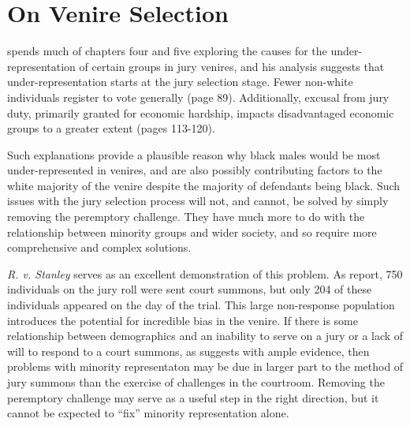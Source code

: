 \section{On Venire Selection}

\cite{vandykejurysel} spends much of chapters four and five exploring the causes for the under-representation of certain groups in
jury venires, and his analysis suggests that under-representation
starts at the jury selection stage. Fewer non-white
individuals register to vote generally (page 89). Additionally,
excusal from jury duty, primarily granted for economic
hardship, impacts disadvantaged economic groups to a greater extent (pages 113-120).

Such explanations provide a plausible reason why black males would be
most under-represented in venires, and are also possibly contributing
factors to the white majority of the venire despite the majority of defendants being black. Such issues with the jury
selection process will not, and cannot, be solved by simply removing the peremptory challenge. They have much more to do with the
relationship between minority groups and wider society, and so require more comprehensive and complex solutions.

\textit{R. v. Stanley} serves as an excellent demonstration of this problem. As \cite{boushie750} report, 750 individuals on the
jury roll were sent court summons, but only 204 of these individuals appeared on the day of the trial. This large non-response
population introduces the potential for incredible bias in the venire. If there is some
relationship between demographics and an inability to serve on a jury or a lack of will to respond to a court summons, as
\cite{vandykejurysel} suggests with ample evidence, then problems with minority representaton may be due in larger part to the
method of jury summons than the exercise of challenges in the courtroom. Removing the peremptory challenge may serve as a useful
step in the right direction, but it cannot be expected to ``fix'' minority representation alone.
